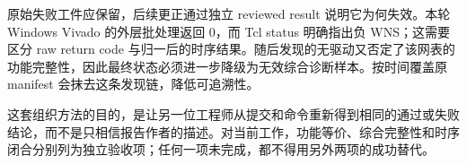 原始失败工件应保留，后续更正通过独立 reviewed result 说明它为何失效。本轮 Windows Vivado 的外层批处理返回 0，而 Tcl status 明确指出负 WNS；这需要区分 raw return code 与归一后的时序结果。随后发现的无驱动又否定了该网表的功能完整性，因此最终状态必须进一步降级为无效综合诊断样本。按时间覆盖原 manifest 会抹去这条发现链，降低可追溯性。

这套组织方法的目的，是让另一位工程师从提交和命令重新得到相同的通过或失败结论，而不是只相信报告作者的描述。对当前工作，功能等价、综合完整性和时序闭合分别列为独立验收项；任何一项未完成，都不得用另外两项的成功替代。
